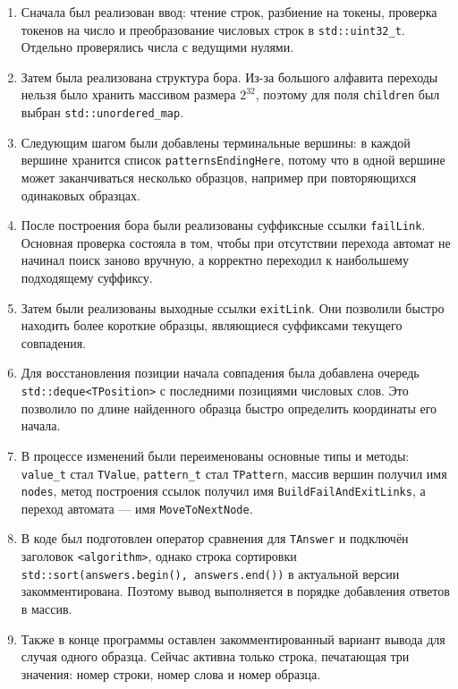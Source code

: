 \documentclass[12pt]{article}
\begin{document}
\begin{enumerate}
    \item Сначала был реализован ввод: чтение строк, разбиение на токены, проверка токенов на число и преобразование числовых строк в \texttt{std::uint32\_t}. Отдельно проверялись числа с ведущими нулями.

    \item Затем была реализована структура бора. Из-за большого алфавита переходы нельзя было хранить массивом размера $2^{32}$, поэтому для поля \texttt{children} был выбран \texttt{std::unordered\_map}.

    \item Следующим шагом были добавлены терминальные вершины: в каждой вершине хранится список \texttt{patternsEndingHere}, потому что в одной вершине может заканчиваться несколько образцов, например при повторяющихся одинаковых образцах.

    \item После построения бора были реализованы суффиксные ссылки \texttt{failLink}. Основная проверка состояла в том, чтобы при отсутствии перехода автомат не начинал поиск заново вручную, а корректно переходил к наибольшему подходящему суффиксу.

    \item Затем были реализованы выходные ссылки \texttt{exitLink}. Они позволили быстро находить более короткие образцы, являющиеся суффиксами текущего совпадения.

    \item Для восстановления позиции начала совпадения была добавлена очередь \texttt{std::deque<TPosition>} с последними позициями числовых слов. Это позволило по длине найденного образца быстро определить координаты его начала.

    \item В процессе изменений были переименованы основные типы и методы: \texttt{value\_t} стал \texttt{TValue}, \texttt{pattern\_t} стал \texttt{TPattern}, массив вершин получил имя \texttt{nodes}, метод построения ссылок получил имя \texttt{BuildFailAndExitLinks}, а переход автомата --- имя \texttt{MoveToNextNode}.

    \item В коде был подготовлен оператор сравнения для \texttt{TAnswer} и подключён заголовок \texttt{<algorithm>}, однако строка сортировки \texttt{std::sort(answers.begin(), answers.end())} в актуальной версии закомментирована. Поэтому вывод выполняется в порядке добавления ответов в массив.

    \item Также в конце программы оставлен закомментированный вариант вывода для случая одного образца. Сейчас активна только строка, печатающая три значения: номер строки, номер слова и номер образца.
\end{enumerate}
\end{document}
